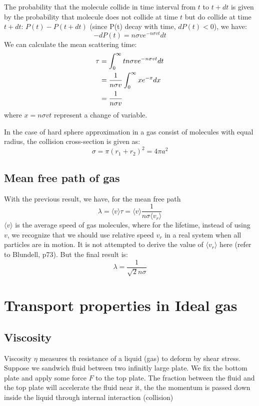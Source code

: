 \documentclass{article}
\begin{document}
The probability that the molecule collide in time interval from $t$ to $t+dt$ is given by
the probability that molecule does not collide at time $t$ but do collide at time $t + dt$:
$P(t) - P(t + dt)$ (since P(t) decay with time, $dP(t) < 0$), we have:
\begin{equation}
    - dP(t) = n\sigma v e^{-n\sigma vt} dt
\end{equation}
We can calculate the mean scattering time:
\begin{align}
    \tau &= \int_{0}^{\infty} t n \sigma v e^{-n\sigma vt} dt \notag \\
         &= \frac{1}{n\sigma v} \int_{0}^{\infty} x e^{-x} dx \notag \\
         &= \frac{1}{n\sigma v}
\end{align}
where $x = n\sigma v t$ represent a change of variable.

In the case of hard sphere approximation in a gas consist of molecules with
equal radius, the collision cross-section is given as:
\begin{equation}
    \sigma = \pi (r_1 + r_2) ^ 2 = 4 \pi a^2
\end{equation}

\subsection*{Mean free path of gas}
With the previous result, we have, for the mean free path
\begin{equation}
    \lambda = \langle v \rangle \tau = \langle v \rangle \frac{1}{n\sigma \langle v_r\rangle }
\end{equation}
$\langle v \rangle$ is the average speed of gas molecules,
where for the lifetime, instead of using $v$, we recognize that we should use 
relative speed $v_r$ in a real system when all particles are in motion. It is not attempted to derive
the value of $\langle v_r\rangle$ here (refer to Blundell, p73). But the final result
is: 
\begin{equation}
    \lambda = \frac{1}{\sqrt{2}n\sigma}
\end{equation}

\section{Transport properties in Ideal gas}

\subsection*{Viscosity}
Viscosity $\eta$ measures th resistance of a liquid (gas) to deform by shear stress. Suppose we sandwich fluid between 
two infinitly large plate. We fix the bottom plate and apply some force $F$ to the top plate. The fraction between the fluid and 
the top plate will accelerate the fluid near it, the the momentum is passed down inside the liquid through internal interaction (collision)
\end{document}
